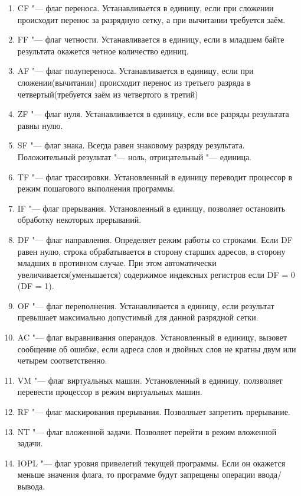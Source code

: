 \begin{enumerate}
\item CF "--- флаг переноса. Устанавливается в единицу, если при сложении происходит перенос за разрядную сетку, а при вычитании
требуется заём. 
\item FF "--- флаг четности. Устанавливается в единицу, если в младшем байте результата окажется четное количество единиц.
\item AF "--- флаг полупереноса. Устанавливается в единицу, если при сложении(вычитании) происходит перенос из третьего разряда
в четвертый(требуется заём из четвертого в третий)
\item ZF "--- флаг нуля. Устанавливается в единицу, если все разряды результата равны нулю.
\item SF "--- флаг знака. Всегда равен знаковому разряду результата. Положительный результат "--- ноль, отрицательный "--- единица.
\item TF "--- флаг трассировки. Установленный в единицу переводит процессор в режим пошагового выполнения программы.
\item IF "--- флаг прерывания. Установленный в единицу, позволяет остановить обработку некоторых прерываний.
\item DF "--- флаг направления. Определяет режим работы со строками. Если DF равен нулю, строка обрабатывается в сторону старших
адресов, в сторону младших в противном случае. При этом автоматически увеличивается(уменьшается) содержимое индексных регистров
если DF = 0 (DF = 1).
\item OF "--- флаг переполнения. Устанавливается в единицу, если результат превышает максимально допустимый для данной разрядной
сетки.
\item AC "--- флаг выравнивания операндов. Установленный в единицу, вызовет сообщение об ошибке, если адреса слов и двойных слов
не кратны двум или четырем соответственно.
\item VM "--- флаг виртуальных машин. Установленный в единицу, ползволяет перевести процессор в режим виртуальных машин.
\item RF "--- флаг маскирования прерывания. Позволяыет запретить прерывание.
\item NT "--- флаг вложенной задачи. Позволяет перейти в режим вложенной задачи.
\item IOPL "--- флаг уровня привелегий текущей программы. Если он окажется меньше значения флага, то программе будут запрещены
операции ввода/вывода.
\end{enumerate} 

